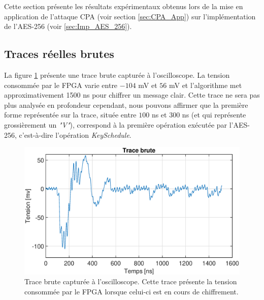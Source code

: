 \documentclass[oneside]{book}
\begin{document}
Cette section présente les résultats expérimentaux obtenus lors de la mise en application de l'attaque CPA (voir section \ref{sec:CPA_App}) sur l'implémentation de l'AES-256 (voir \ref{sec:Imp_AES_256}).

\subsection{Traces réelles brutes}
\label{sec:real_trace}

La figure \ref{fig:trace_brute} présente une trace brute capturée à l'oscilloscope. La tension consommée par le FPGA varie entre $-104$ \si{\milli\volt} et $56$ \si{\milli\volt} et l'algorithme met approximativement 1500 \si{\nano\second} pour chiffrer un message clair. Cette trace ne sera pas plus analysée en profondeur cependant, nous pouvons affirmer que la première forme représentée sur la trace, située entre $100$ \si{\nano\second} et $300$ \si{\nano\second} (et qui représente grossièrement un \textit{"V"}),  correspond à la première opération exécutée par l'AES-256, c'est-à-dire l'opération \textit{KeySchedule}.

\begin{figure}[htbp]
    \hspace{-2cm}
    \includegraphics[scale=0.6]{image/trace_brute}
    \caption{Trace brute capturée à l'oscilloscope. Cette trace présente la tension consommée par le FPGA lorsque celui-ci est en cours de chiffrement.}
    \label{fig:trace_brute} 
\end{figure}
\end{document}
